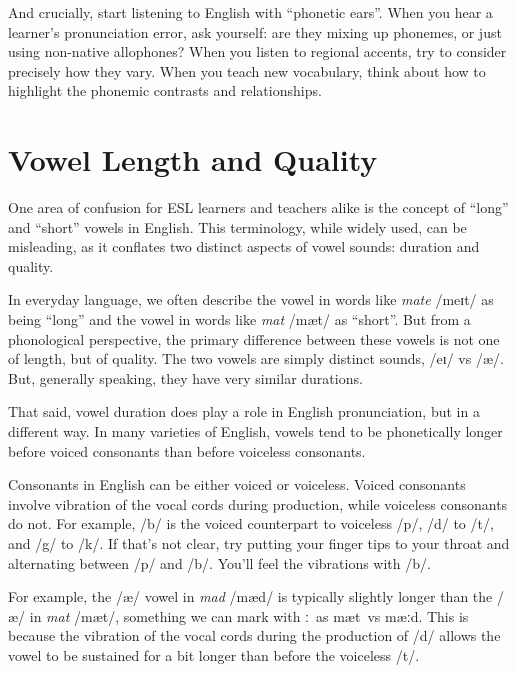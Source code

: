 And crucially, start listening to English with ``phonetic ears''. When you hear a learner's pronunciation error, ask yourself: are they mixing up phonemes, or just using non-native allophones? When you listen to regional accents, try to consider precisely how they vary. When you teach new vocabulary, think about how to highlight the phonemic contrasts and relationships.

\section{Vowel Length and Quality} \label{sec:long-vowels}

One area of confusion for ESL learners and teachers alike is the concept of ``long'' and ``short'' vowels in English. This terminology, while widely used, can be misleading, as it conflates two distinct aspects of vowel sounds: duration and quality.

In everyday language, we often describe the vowel in words like \textit{mate} /meɪt/ as being ``long'' and the vowel in words like \textit{mat} /mæt/ as ``short''. But from a phonological perspective, the primary difference between these vowels is not one of length, but of quality. The two vowels are simply distinct sounds, /eɪ/ vs /æ/. But, generally speaking, they have very similar durations.

That said, vowel duration does play a role in English pronunciation, but in a different way. In many varieties of English, vowels tend to be phonetically longer before voiced consonants than before voiceless consonants.

\begin{tcolorbox}[title=Consonant Voicing]
Consonants in English can be either voiced or voiceless. Voiced consonants involve vibration of the vocal cords during production, while voiceless consonants do not. For example, /b/ is the voiced counterpart to voiceless /p/, /d/ to /t/, and /g/ to /k/. If that's not clear, try putting your finger tips to your throat and alternating between /p/ and /b/. You'll feel the vibrations with /b/.
\end{tcolorbox}

For example, the /æ/ vowel in \textit{mad} /mæd/ is typically slightly longer than the /æ/ in \textit{mat} /mæt/, something we can mark with \ob ː{\cb}~as \ob mæt{\cb}~vs \ob mæːd{\cb}. This is because the vibration of the vocal cords during the production of /d/ allows the vowel to be sustained for a bit longer than before the voiceless /t/.

